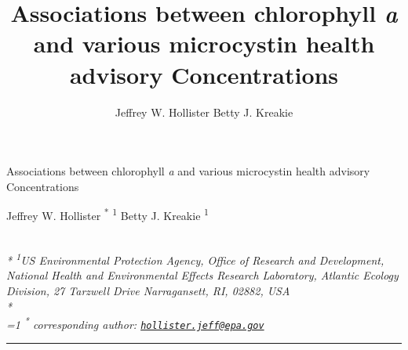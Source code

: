 \documentclass[11pt,]{article}
\title{Associations between chlorophyll \emph{a} and various microcystin health
advisory Concentrations}
\author{
Jeffrey W. Hollister
Betty J. Kreakie
}
\date{}
\begin{document}
\begin{singlespace}
\begin{center}
\huge Associations between chlorophyll \emph{a} and various microcystin health
advisory Concentrations
\end{center}
\begin{center}
\large
Jeffrey W. Hollister \textsuperscript{*} \textsuperscript{1} 
Betty J. Kreakie \textsuperscript{1} 
\end{center}
\begin{justify}
\footnotesize \emph{ 
\\*
\textsuperscript{1}US Environmental Protection Agency, Office of Research and Development,
National Health and Environmental Effects Research Laboratory, Atlantic
Ecology Division, 27 Tarzwell Drive Narragansett, RI, 02882, USA\\*
}
\setcounter{num}{1}
\\[0.1cm]
\footnotesize \emph{ 
\ifnum\value{num}=1%
\textsuperscript{*} corresponding author:
\fi
\href{mailto:hollister.jeff@epa.gov}{\nolinkurl{hollister.jeff@epa.gov}}
}
\end{justify}
\normalsize

\end{singlespace}


\singlespace

\vspace{2mm}

\hrule
\end{document}
